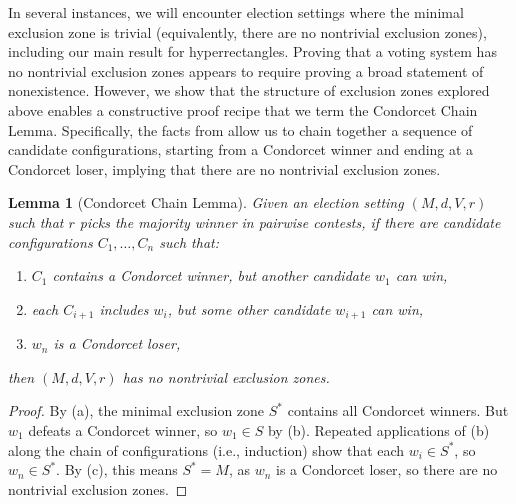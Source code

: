 \documentclass{article}
\theoremstyle{theorem}
\newtheorem{lemma}{Lemma}
\theoremstyle{definition}
\begin{document}
In several instances, we will encounter election settings where the minimal exclusion zone is trivial (equivalently, there are no nontrivial exclusion zones), including our main result for hyperrectangles. Proving that a voting system has no nontrivial exclusion zones appears to require proving a broad statement of nonexistence. However, we show that the structure of exclusion zones explored above enables a constructive proof recipe that we term the Condorcet Chain Lemma. Specifically, the facts from  allow us to chain together a sequence of candidate configurations, starting from a Condorcet winner and ending at a Condorcet loser, implying that there are no nontrivial exclusion zones. 
\begin{lemma}[Condorcet Chain Lemma]\label{lemma:chain}
   Given an election setting $(M, d, V, r)$ such that $r$ picks the majority winner in pairwise contests, if there are candidate configurations $C_1, \dots, C_n$ such that:
  \begin{enumerate}
    \item $C_1$ contains a Condorcet winner, but another candidate $w_1$ can win,
    \item each $C_{i+1}$ includes $w_i$, but some other candidate $w_{i+1}$ can win,
    \item $w_n$ is a Condorcet loser,
  \end{enumerate}
  then $(M, d, V, r)$ has no nontrivial exclusion zones.
\end{lemma}
\begin{proof}
  By (a), the minimal exclusion zone $S^*$ contains all Condorcet winners. But $w_1$ defeats a Condorcet winner, so $w_1 \in S$ by (b). Repeated applications of (b) along the chain of configurations (i.e., induction) show that each $w_i \in S^*$, so $w_n \in S^*$. By (c), this means $S^* = M$, as $w_n$ is a Condorcet loser, so there are no nontrivial exclusion zones. 
\end{proof}
\end{document}

